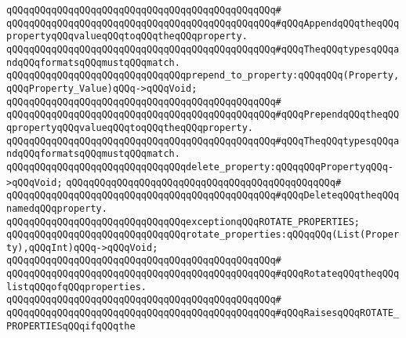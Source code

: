 \verb|qQQqqQQqqQQqqQQqqQQqqQQqqQQqqQQqqQQqqQQqqQQqqQQq#|\newline
\verb|qQQqqQQqqQQqqQQqqQQqqQQqqQQqqQQqqQQqqQQqqQQqqQQq#qQQqAppendqQQqtheqQQqpropertyqQQqvalueqQQqtoqQQqtheqQQqproperty.|\newline
\verb|qQQqqQQqqQQqqQQqqQQqqQQqqQQqqQQqqQQqqQQqqQQqqQQq#qQQqTheqQQqtypesqQQqandqQQqformatsqQQqmustqQQqmatch.|\newline
\newline
\newline
\verb|qQQqqQQqqQQqqQQqqQQqqQQqqQQqqQQqprepend_to_property:qQQqqQQq(Property,qQQqProperty_Value)qQQq->qQQqVoid;|\newline
\verb|qQQqqQQqqQQqqQQqqQQqqQQqqQQqqQQqqQQqqQQqqQQqqQQq#|\newline
\verb|qQQqqQQqqQQqqQQqqQQqqQQqqQQqqQQqqQQqqQQqqQQqqQQq#qQQqPrependqQQqtheqQQqpropertyqQQqvalueqQQqtoqQQqtheqQQqproperty.|\newline
\verb|qQQqqQQqqQQqqQQqqQQqqQQqqQQqqQQqqQQqqQQqqQQqqQQq#qQQqTheqQQqtypesqQQqandqQQqformatsqQQqmustqQQqmatch.|\newline
\newline
\newline
\newline
\verb|qQQqqQQqqQQqqQQqqQQqqQQqqQQqqQQqdelete_property:qQQqqQQqPropertyqQQq->qQQqVoid;|\newline
\verb|qQQqqQQqqQQqqQQqqQQqqQQqqQQqqQQqqQQqqQQqqQQqqQQq#|\newline
\verb|qQQqqQQqqQQqqQQqqQQqqQQqqQQqqQQqqQQqqQQqqQQqqQQq#qQQqDeleteqQQqtheqQQqnamedqQQqproperty.|\newline
\newline
\newline
\newline
\verb|qQQqqQQqqQQqqQQqqQQqqQQqqQQqqQQqexceptionqQQqROTATE_PROPERTIES;|\newline
\newline
\newline
\verb|qQQqqQQqqQQqqQQqqQQqqQQqqQQqqQQqrotate_properties:qQQqqQQq(List(Property),qQQqInt)qQQq->qQQqVoid;|\newline
\verb|qQQqqQQqqQQqqQQqqQQqqQQqqQQqqQQqqQQqqQQqqQQqqQQq#|\newline
\verb|qQQqqQQqqQQqqQQqqQQqqQQqqQQqqQQqqQQqqQQqqQQqqQQq#qQQqRotateqQQqtheqQQqlistqQQqofqQQqproperties.|\newline
\verb|qQQqqQQqqQQqqQQqqQQqqQQqqQQqqQQqqQQqqQQqqQQqqQQq#|\newline
\verb|qQQqqQQqqQQqqQQqqQQqqQQqqQQqqQQqqQQqqQQqqQQqqQQq#qQQqRaisesqQQqROTATE_PROPERTIESqQQqifqQQqthe|\newline
